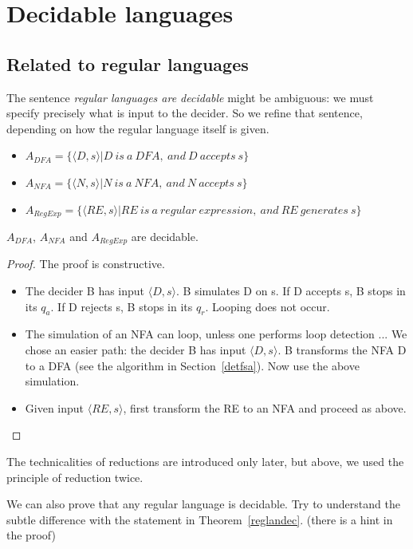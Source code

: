 \section{Decidable languages}

\subsection{Related to regular languages}

The sentence {\em regular languages are decidable} might be ambiguous:
we must specify precisely what is input to the decider. So we refine
that sentence, depending on how the regular language itself is given.


\begin{itemize}
\item
$A_{DFA} = \{\langle D,s \rangle|D~is~a~DFA,~and~D~accepts~s\}$
\item
$A_{NFA} = \{\langle N,s \rangle|N~is~a~NFA,~and~N~accepts~s\}$
\item
$A_{RegExp} = \{\langle RE,s
  \rangle|RE~is~a~regular~expression,~and~RE~generates~s\}$
\end{itemize}

\begin{theorem} \label{reglandec}
$A_{DFA}$, $A_{NFA}$ and $A_{RegExp}$ are decidable.
\end{theorem}
\begin{proof}
The proof is constructive.
\begin{itemize}
\item
The decider B has input $\langle D,s \rangle$. B simulates D on s. If
D accepts s, B stops in its $q_a$. If D rejects s, B stops in its
$q_r$. Looping does not occur.

\item
The simulation of an NFA can loop, unless one performs loop detection
... We chose an easier path: the decider B has input $\langle D,s
\rangle$. B transforms the NFA D to a DFA (see the algorithm in
Section~\ref{detfsa}). Now use the above simulation.

\item
Given input $\langle RE,s \rangle$, first transform the RE to an NFA
and proceed as above.
\end{itemize}
\end{proof}

The technicalities of reductions are introduced only later, but
above, we used the principle of reduction twice.

We can also prove that any regular language is decidable. Try to
understand the subtle difference with the statement in
Theorem~\ref{reglandec}. (there is a hint in the proof)

